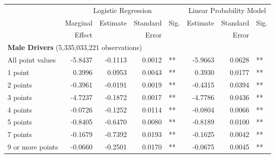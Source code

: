 
\begin{table}%
\centering 
\begin{tabular}{l r r r l r r l} 

\hline 
 
 & \multicolumn{4}{c}{Logistic Regression}  & \multicolumn{3}{c}{Linear Probability Model} \\ 

 \cmidrule(lr){2-5}\cmidrule(lr){6-8} 
 & Marginal & Estimate & Standard & Sig. & Estimate & Standard & Sig. \\ 
 &   Effect &          &  Error   &      &          &  Error   &     \\ 

\hline 
 
\multicolumn{7}{l}{\textbf{Male Drivers} (5,335,033,221 observations)} \\ 

All point values                &  -5.8437       &  -0.1113        &  0.0012       &   **       &  -5.9663        &  0.0628       &   **       \\ 
1 point                         &  0.3996       &  0.0953        &  0.0043       &   **       &  0.3930        &  0.0177       &   **       \\ 
2 points                        &  -0.3961       &  -0.0191        &  0.0019       &   **       &  -0.4315        &  0.0394       &   **       \\ 
3 points                        &  -4.7237       &  -0.1872        &  0.0017       &   **       &  -4.7786        &  0.0436       &   **       \\ 
4 points                        &  -0.0726       &  -0.1252        &  0.0114       &   **       &  -0.0804        &  0.0066       &   **       \\ 
5 points                        &  -0.8405       &  -0.6470        &  0.0080       &   **       &  -0.8189        &  0.0100       &   **       \\ 
7 points                        &  -0.1679       &  -0.7392        &  0.0193       &   **       &  -0.1625        &  0.0042       &   **       \\ 
9 or more points                &  -0.0660       &  -0.2501        &  0.0170       &   **       &  -0.0675        &  0.0045       &   **       \\ 


\end{tabular}
\end{table}

